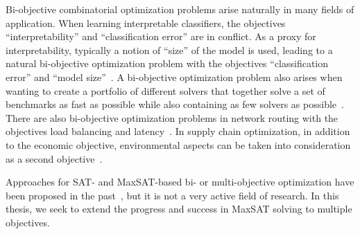 Bi-objective combinatorial optimization problems arise naturally in many fields of application.
When learning interpretable classifiers, the objectives ``interpretability'' and ``classification error'' are in conflict.
As a proxy for interpretability, typically a notion of ``size'' of the model is used, leading to a natural bi-objective optimization problem with the objectives ``classification error'' and ``model size''~\autocites{DBLP:conf/ijcai/Ignatiev0NS21,DBLP:conf/cp/MaliotovM18,DBLP:conf/ijcai/NarodytskaIPM18,DBLP:conf/ijcai/Hu0HH20,DBLP:conf/cp/YuISB20,DBLP:conf/aaai/Ignatiev0S021,DBLP:conf/cade/IgnatievPNM18}.
A bi-objective optimization problem also arises when wanting to create a portfolio of different solvers that together solve a set of benchmarks as fast as possible while also containing as few solvers as possible~\autocite{DBLP:conf/cp/JanotaMSM21}.
There are also bi-objective optimization problems in network routing with the objectives load balancing and latency~\autocite{SilverioEtAl2022biobjectiveoptimization}.
In supply chain optimization, in addition to the economic objective, environmental aspects can be taken into consideration as a second objective~\autocites{DBLP:journals/cce/Pinto-VarelaBN11,DBLP:journals/candie/TautenhainBN19}.

Approaches for SAT- and MaxSAT-based bi- or multi-objective optimization have been proposed in the past~\autocites{DBLP:conf/cp/SohBTB17,DBLP:conf/ijcai/Terra-NevesLM18a,DBLP:conf/aaai/Terra-NevesLM18,DBLP:conf/ijcai/Terra-NevesLM18,DBLP:conf/cp/JanotaMSM21}, but it is not a very active field of research.
In this thesis, we seek to extend the progress and success in MaxSAT solving to multiple objectives.

